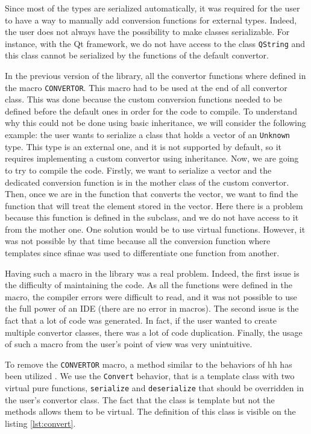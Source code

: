 Since most of the types are serialized automatically, it was required for the
user to have a way to manually add conversion functions for external types.
Indeed, the user does not always have the possibility to make classes
serializable. For instance, with the Qt framework, we do not have access to the
class \texttt{QString} and this class cannot be serialized by the functions of
the default convertor.

In the previous version of the library, all the convertor functions where
defined in the macro \texttt{CONVERTOR}. This macro had to be used at the end of
all convertor class. This was done because the custom conversion functions
needed to be defined before the default ones in order for the code to compile.
To understand why this could not be done using basic inheritance, we will
consider the following example: the user wants to serialize a class that holds a
vector of an \texttt{Unknown} type. This type is an external one, and it is not
supported by default, so it requires implementing a custom convertor using
inheritance. Now, we are going to try to compile the code. Firstly, we want to
serialize a vector and the dedicated conversion function is in the mother class
of the custom convertor. Then, once we are in the function that converts the
vector, we want to find the function that will treat the element stored in the
vector. Here there is a problem because this function is defined in the
subclass, and we do not have access to it from the mother one. One solution
would be to use virtual functions. However, it was not possible by that time
because all the conversion function where templates since \gls{sfinae} was used
to differentiate one function from another.

Having such a macro in the library was a real problem. Indeed, the first issue
is the difficulty of maintaining the code. As all the functions were defined in
the macro, the compiler errors were difficult to read, and it was not possible
to use the full power of an IDE (there are no error in macros). The second issue
is the fact that a lot of code was generated. In fact, if the user wanted to
create multiple convertor classes, there was a lot of code duplication. Finally,
the usage of such a macro from the user's point of view was very unintuitive.

To remove the \texttt{CONVERTOR} macro, a method similar to the behaviors of
\gls{hh} has been utilized \cite{bardakoff2021analysis}. We use the
\texttt{Convert} behavior, that is a template class with two virtual pure
functions, \texttt{serialize} and \texttt{deserialize} that should be overridden
in the user's convertor class. The fact that the class is template but not the
methods allows them to be virtual. The definition of this class is visible on
the listing \ref{lst:convert}.

